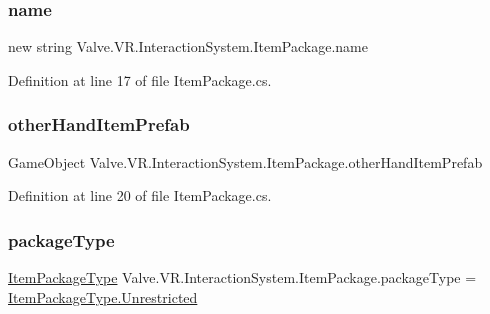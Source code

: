 \subsubsection{\texorpdfstring{name}{name}}
{\footnotesize\ttfamily new string Valve.\+V\+R.\+Interaction\+System.\+Item\+Package.\+name}



Definition at line 17 of file Item\+Package.\+cs.

\mbox{\label{class_valve_1_1_v_r_1_1_interaction_system_1_1_item_package_ae44ffa29d6e137f6dadc09a359ae91b4}} 
\subsubsection{\texorpdfstring{otherHandItemPrefab}{otherHandItemPrefab}}
{\footnotesize\ttfamily Game\+Object Valve.\+V\+R.\+Interaction\+System.\+Item\+Package.\+other\+Hand\+Item\+Prefab}



Definition at line 20 of file Item\+Package.\+cs.

\mbox{\label{class_valve_1_1_v_r_1_1_interaction_system_1_1_item_package_a2e9d3726fe44f4f2fc5a9fa9a906868b}} 
\subsubsection{\texorpdfstring{packageType}{packageType}}
{\footnotesize\ttfamily \mbox{\hyperlink{class_valve_1_1_v_r_1_1_interaction_system_1_1_item_package_a8d2fe408f7b1222964bcb4efe22ff9a4}{Item\+Package\+Type}} Valve.\+V\+R.\+Interaction\+System.\+Item\+Package.\+package\+Type = \mbox{\hyperlink{class_valve_1_1_v_r_1_1_interaction_system_1_1_item_package_a8d2fe408f7b1222964bcb4efe22ff9a4a89c6caacc7047b0a535412d7f939f870}{Item\+Package\+Type.\+Unrestricted}}}




